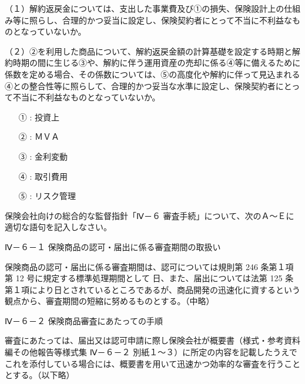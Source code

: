 \documentclass[report,gutter=10mm,fore-edge=10mm,uplatex,dvipdfmx]{jlreq}
\begin{document}
（１）解約返戻金については、支出した事業費及び①の損失、保険設計上の仕組み等に照らし、合理的かつ妥当に設定し、保険契約者にとって不当に不利益なものとなっていないか。

（２）②を利用した商品について、解約返戻金額の計算基礎を設定する時期と解約時期の間に生じる③や、解約に伴う運用資産の売却に係る④等に備えるために係数を定める場合、その係数については、⑤の高度化や解約に伴って見込まれる④との整合性等に照らして、合理的かつ妥当な水準に設定し、保険契約者にとって不当に不利益なものとなっていないか。

\answer{}
\begin{itemize}
\item[ ① : ] 投資上 
\item[ ② : ] ＭＶＡ 
\item[ ③ : ] 金利変動
\item[ ④ : ] 取引費用 
\item[ ⑤ : ] リスク管理
\end{itemize}

保険会社向けの総合的な監督指針「Ⅳ－６ 審査手続」について、次のＡ～Ｅに適切な語句を記入しなさい。

Ⅳ－６－１ 保険商品の認可・届出に係る審査期間の取扱い

保険商品の認可・届出に係る審査期間は、認可については規則第 246 条第１項第 12 号に規定する標準処理期間として
日、また、届出については法第 125 条第１項により日とされているところであるが、商品開発の迅速化に資するという観点から、審査期間の短縮に努めるものとする。（中略）

Ⅳ－６－２ 保険商品審査にあたっての手順

審査にあたっては、届出又は認可申請に際し保険会社が概要書（様式・参考資料編その他報告等様式集 Ⅳ－６－２ 別紙１～３）に所定の内容を記載したうえでこれを添付している場合には、概要書を用いて迅速かつ効率的な審査を行うこととする。（以下略）
\end{document}
